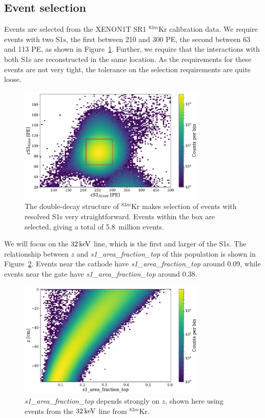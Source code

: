\subsection{Event selection}

Events are selected from the XENON1T SR1 $^{83m}$Kr calibration data. We require events with two S1s, the first between 210 and 300 PE, the second between 63 and 113 PE, as shown in Figure~\ref{fig:s1a_s1b}. Further, we require that the interactions with both S1s are reconstructed in the same location. As the requirements for these events are not very tight, the tolerance on the selection requirements are quite loose.

\begin{figure}[htb]
    \centering
    \includegraphics[width=0.8\textwidth]{figures/s1aft/sr1_83mkr_s1s}
    \caption{The double-decay structure of $^{83m}$Kr makes selection of events with resolved S1s very straightforward. Events within the box are selected, giving a total of 5.8~million events.}\label{fig:s1a_s1b}
\end{figure}

We will focus on the $32\,\mathrm{keV}$ line, which is the first and larger of the S1s. The relationship between $z$ and \textit{s1\_area\_fraction\_top} of this population is shown in Figure~\ref{fig:z_aft}. Events near the cathode have \textit{s1\_area\_fraction\_top} around 0.09, while events near the gate have \textit{s1\_area\_fraction\_top} around 0.38.

\begin{figure}[htb]
\centering
    \includegraphics[width=0.8\textwidth]{figures/s1aft/z_s1aft}
    \caption{\textit{s1\_area\_fraction\_top} depends strongly on $z$, shown here using events from the $32\,\mathrm{keV}$ line from $^{83m}$Kr.}\label{fig:z_aft}
\end{figure}

